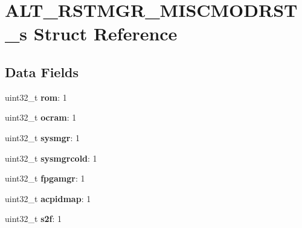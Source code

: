 \hypertarget{structALT__RSTMGR__MISCMODRST__s}{}\section{A\+L\+T\+\_\+\+R\+S\+T\+M\+G\+R\+\_\+\+M\+I\+S\+C\+M\+O\+D\+R\+S\+T\+\_\+s Struct Reference}
\label{structALT__RSTMGR__MISCMODRST__s}
\subsection*{Data Fields}
\begin{DoxyCompactItemize}
\item 
\mbox{\label{structALT__RSTMGR__MISCMODRST__s_a2d27b9ae2b06ab5d5adc7b1e4bec9ea8}} 
uint32\+\_\+t {\bfseries rom}\+: 1
\item 
\mbox{\label{structALT__RSTMGR__MISCMODRST__s_a4875744d7c752a0e7d6003fb034b8f82}} 
uint32\+\_\+t {\bfseries ocram}\+: 1
\item 
\mbox{\label{structALT__RSTMGR__MISCMODRST__s_a71bee89aa33a3364069dc50c157c388f}} 
uint32\+\_\+t {\bfseries sysmgr}\+: 1
\item 
\mbox{\label{structALT__RSTMGR__MISCMODRST__s_ae18fbd6c0bd0e577c542253f677bfac9}} 
uint32\+\_\+t {\bfseries sysmgrcold}\+: 1
\item 
\mbox{\label{structALT__RSTMGR__MISCMODRST__s_a5f5d3c5b0cf46695a7a7b6e6daf4d6de}} 
uint32\+\_\+t {\bfseries fpgamgr}\+: 1
\item 
\mbox{\label{structALT__RSTMGR__MISCMODRST__s_a57d24076c1bacaba9380af172d44458d}} 
uint32\+\_\+t {\bfseries acpidmap}\+: 1
\item 
\mbox{\label{structALT__RSTMGR__MISCMODRST__s_a61ff7e5c4f39b455e75a6355be2975b6}} 
uint32\+\_\+t {\bfseries s2f}\+: 1
\item 
\mbox{\label{structALT__RSTMGR__MISCMODRST__s_a56ba1d5fc4094286f0473d06b8ce2e77}} 

\end{DoxyCompactItemize}
